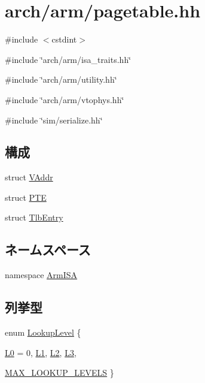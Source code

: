 \hypertarget{arm_2pagetable_8hh}{
\section{arch/arm/pagetable.hh}
\label{arm_2pagetable_8hh}
}
{\ttfamily \#include $<$cstdint$>$}\par
{\ttfamily \#include \char`\"{}arch/arm/isa\_\-traits.hh\char`\"{}}\par
{\ttfamily \#include \char`\"{}arch/arm/utility.hh\char`\"{}}\par
{\ttfamily \#include \char`\"{}arch/arm/vtophys.hh\char`\"{}}\par
{\ttfamily \#include \char`\"{}sim/serialize.hh\char`\"{}}\par
\subsection*{構成}
\begin{DoxyCompactItemize}
\item 
struct \hyperlink{structArmISA_1_1VAddr}{VAddr}
\item 
struct \hyperlink{structArmISA_1_1PTE}{PTE}
\item 
struct \hyperlink{structArmISA_1_1TlbEntry}{TlbEntry}
\end{DoxyCompactItemize}
\subsection*{ネームスペース}
\begin{DoxyCompactItemize}
\item 
namespace \hyperlink{namespaceArmISA}{ArmISA}
\end{DoxyCompactItemize}
\subsection*{列挙型}
\begin{DoxyCompactItemize}
\item 
enum \hyperlink{namespaceArmISA_aefa4213b348e38ee69f2a6109563a7bd}{LookupLevel} \{ \par
\hyperlink{namespaceArmISA_aefa4213b348e38ee69f2a6109563a7bda51451264203360e0ffacec9b6d8ef7c9}{L0} =  0, 
\hyperlink{namespaceArmISA_aefa4213b348e38ee69f2a6109563a7bdae5bc7ee7d6dda5340a28f91834f10543}{L1}, 
\hyperlink{namespaceArmISA_aefa4213b348e38ee69f2a6109563a7bda0adffb24dae0c41be5b803f4d444f066}{L2}, 
\hyperlink{namespaceArmISA_aefa4213b348e38ee69f2a6109563a7bda78d20b793a10e7c2f1012114803147c3}{L3}, 
\par
\hyperlink{namespaceArmISA_aefa4213b348e38ee69f2a6109563a7bdac130f49c8efeba8c4f65928f5f03a1db}{MAX\_\-LOOKUP\_\-LEVELS}
 \}
\end{DoxyCompactItemize}
